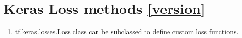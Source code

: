 \documentclass[11pt]{article}
\begin{document}
\begin{multicols*}{2}
\begin{itemize}
\end{itemize}



\section{Keras Loss methods  \autoref{version}}
\begin{enumerate}
\item tf.keras.losses.Loss class can be subclassed to define custom loss functions.
\end{enumerate}


\end{multicols*}
\end{document}
